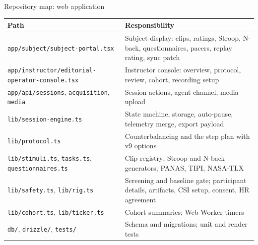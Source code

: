 \documentclass[aspectratio=169,11pt]{beamer}
\newcommand{\code}[1]{{\small\texttt{#1}}}
\begin{document}
\begin{frame}{Repository map: web application}
  \footnotesize
  \begin{tabularx}{\textwidth}{@{}l X@{}}
    \toprule
    \textbf{Path} & \textbf{Responsibility} \\
    \midrule
    \code{app/subject/subject-portal.tsx} & Subject display: clips, ratings, Stroop, N-back, questionnaires, pacers, replay rating, sync patch \\
    \code{app/instructor/editorial-operator-console.tsx} & Instructor console: overview, protocol, review, cohort, recording setup \\
    \code{app/api/sessions}, \code{acquisition}, \code{media} & Session actions, agent channel, media upload \\
    \code{lib/session-engine.ts} & State machine, storage, auto-pause, telemetry merge, export payload \\
    \code{lib/protocol.ts} & Counterbalancing and the step plan with v9 options \\
    \code{lib/stimuli.ts}, \code{tasks.ts}, \code{questionnaires.ts} & Clip registry; Stroop and N-back generators; PANAS, TIPI, NASA-TLX \\
    \code{lib/safety.ts}, \code{lib/rig.ts} & Screening and baseline gate; participant details, artifacts, CSI setup, consent, HR agreement \\
    \code{lib/cohort.ts}, \code{lib/ticker.ts} & Cohort summaries; Web Worker timers \\
    \code{db/}, \code{drizzle/}, \code{tests/} & Schema and migrations; unit and render tests \\
    \bottomrule
  \end{tabularx}
\end{frame}
\end{document}
